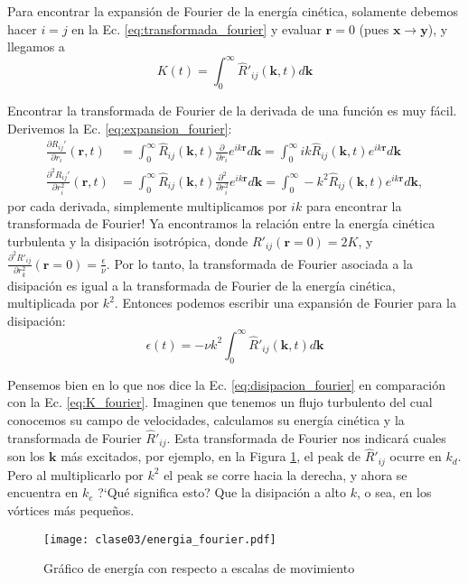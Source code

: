 Para encontrar la expansión de Fourier de la energía cinética, solamente debemos hacer $i=j$ en la Ec. \eqref{eq:transformada_fourier} y evaluar $\mathbf{r}=0$ (pues $\mathbf{x}\to\mathbf{y}$), y llegamos a
%
\begin{equation}\label{eq:K_fourier}
K(t) = \int_0^\infty \hat{R}'_{ij}(\mathbf{k},t)d\mathbf{k}
\end{equation}

Encontrar la transformada de Fourier de la derivada de una función es muy fácil. 
Derivemos la Ec. \eqref{eq:expansion_fourier}:
%
\begin{align}
\frac{\partial R_{ij}'}{\partial r_i}(\mathbf{r},t) &= \int_0^\infty \hat{R}_{ij}(\mathbf{k},t)\frac{\partial}{\partial r_i}e^{ik\mathbf{r}}d\mathbf{k} = \int_0^\infty ik\hat{R}_{ij}(\mathbf{k},t)e^{ik\mathbf{r}}d\mathbf{k}\nonumber\\
\frac{\partial^2 R_{ij}'}{\partial r_i^2}(\mathbf{r},t) &= \int_0^\infty \hat{R}_{ij}(\mathbf{k},t)\frac{\partial^2}{\partial r^2_i}e^{ik\mathbf{r}}d\mathbf{k} = \int_0^\infty -k^2\hat{R}_{ij}(\mathbf{k},t)e^{ik\mathbf{r}}d\mathbf{k},
\end{align}
%
por cada derivada, simplemente multiplicamos por $ik$ para encontrar la transformada de Fourier!
Ya encontramos la relación entre la energía cinética turbulenta y la disipación isotrópica, donde $R'_{ij}(\mathbf{r}=0) = 2K$, y $\frac{\partial^2 R'_{ij}}{\partial r_k^2}(\mathbf{r}=0) = \frac{\epsilon}{\nu}$.
Por lo tanto, la transformada de Fourier asociada a la disipación es igual a la transformada de Fourier de la energía cinética, multiplicada por $k^2$.
Entonces podemos escribir una expansión de Fourier para la disipación:
%
\begin{equation}\label{eq:disipacion_fourier}
\epsilon(t) = -\nu k^2 \int_0^\infty \hat{R}'_{ij}(\mathbf{k},t)d\mathbf{k}
\end{equation}

Pensemos bien en lo que nos dice la Ec. \eqref{eq:disipacion_fourier} en comparación con la Ec. \eqref{eq:K_fourier}.
Imaginen que tenemos un flujo turbulento del cual conocemos su campo de velocidades, calculamos su energía cinética y la transformada de Fourier $\hat{R}'_{ij}$.
Esta transformada de Fourier nos indicará cuales son los $\mathbf{k}$ más excitados, por ejemplo, en la Figura \ref{fig:energia_fourier}, el peak de $\hat{R}'_{ij}$ ocurre en $k_d$.
Pero al multiplicarlo por $k^2$ el peak se corre hacia la derecha, y ahora se encuentra en $k_e$
\mbox{?`}Qué significa esto? Que la disipación a alto $k$, o sea, en los vórtices más pequeños.
%
\begin{figure}[h!]
\centering
\texttt{[image: clase03/energia\_fourier.pdf]}
\caption{Gráfico de energía con respecto a escalas de movimiento}
\label{fig:energia_fourier}
\end{figure}

